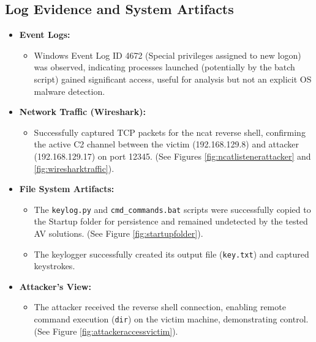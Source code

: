 \documentclass[11pt]{article}
\begin{document}
	\subsection{Log Evidence and System Artifacts}
	\begin{itemize}
		\item \textbf{Event Logs:}
		\begin{itemize}
			\item Windows Event Log ID 4672 (Special privileges assigned to new logon) was observed, indicating processes launched (potentially by the batch script) gained significant access, useful for analysis but not an explicit OS malware detection.
		\end{itemize}
		\item \textbf{Network Traffic (Wireshark):}
		\begin{itemize}
			\item Successfully captured TCP packets for the ncat reverse shell, confirming the active C2 channel between the victim (192.168.129.8) and attacker (192.168.129.17) on port 12345. (See Figures \ref{fig:ncatlistenerattacker} and \ref{fig:wiresharktraffic}).
		\end{itemize}
		\item \textbf{File System Artifacts:}
		\begin{itemize}
			\item The \texttt{keylog.py} and \texttt{cmd\_commands.bat} scripts were successfully copied to the Startup folder for persistence and remained undetected by the tested AV solutions. (See Figure \ref{fig:startupfolder}).
			\item The keylogger successfully created its output file (\texttt{key.txt}) and captured keystrokes.
		\end{itemize}
		\item \textbf{Attacker's View:}
		\begin{itemize}
			\item The attacker received the reverse shell connection, enabling remote command execution (\texttt{dir}) on the victim machine, demonstrating control. (See Figure \ref{fig:attackeraccessvictim}).
		\end{itemize}
	\end{itemize}
	
\end{document}
